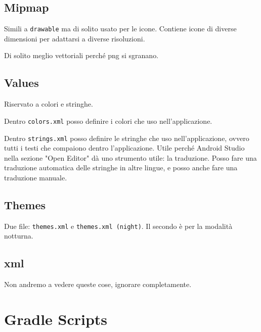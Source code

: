 \subsection{Mipmap}
\par Simili a \texttt{drawable} ma di solito usato per le icone. Contiene icone di diverse dimensioni per adattarsi a diverse risoluzioni. 
\par Di solito meglio vettoriali perché png si sgranano.

\subsection{Values}
\par Riservato a colori e stringhe. 
\par Dentro \texttt{colors.xml} posso definire i colori che uso nell'applicazione.
\par Dentro \texttt{strings.xml} posso definire le stringhe che uso nell'applicazione, ovvero tutti i testi che compaiono dentro l'applicazione. Utile perché Android Studio nella sezione "Open Editor" dà uno strumento utile: la traduzione. Posso fare una traduzione automatica delle stringhe in altre lingue, e posso anche fare una traduzione manuale.

\subsection{Themes}
\par Due file: \texttt{themes.xml} e \texttt{themes.xml (night)}. Il secondo è per la modalità notturna.

\subsection{xml}
\par Non andremo a vedere queste cose, ignorare completamente.

\section{Gradle Scripts}
